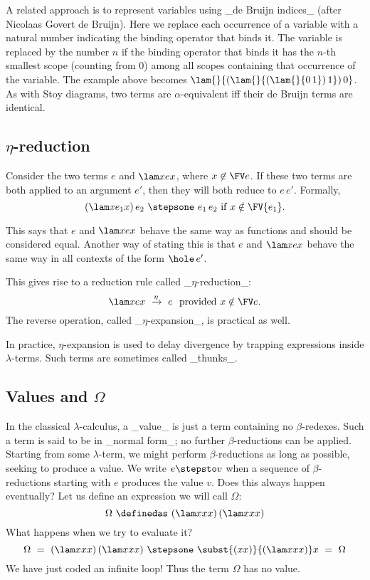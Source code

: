 A related approach is
to represent variables using _de Bruijn indices_ (after Nicolaas Govert de Bruijn). Here we
replace each occurrence of a variable with a natural number indicating the binding operator
that binds it. The variable is replaced by the number $n$ if the binding operator that binds
it has the $n$-th smallest scope (counting from 0) among all scopes containing that occurrence
of the variable. The example above becomes $\lam {}{(\lam {}{(\lam {}{0\,1})\,1})\,0}$.
As with Stoy diagrams, two terms are $\alpha$-equivalent iff their de Bruijn terms are identical.

\subsection{$\eta$-reduction}

Consider the two terms $e$ and $\lam x{ex}$, where $x\not\in\FV e$.
If these two terms are both applied to an argument $e'$, then they will both reduce to $e\,e'$. Formally,
\[
(\lam x{e_1x})\,e_2\ \stepsone\ e_1\,e_2 \text{ if $x\notin\FV{e_1}$}.
\]

This says that $e$ and $\lam x{ex}$ behave the same way as functions and should be considered equal. Another way of stating this is that $e$ and $\lam x{ex}$ behave the same way in all contexts of the form $\hole\,e'$.

This gives rise to a reduction rule called _$\eta$-reduction_:
\[
\lam x{ex}\ \xrightarrow{\eta}\ e\ \text{ provided $x\notin\FV e$}.
\]
The reverse operation, called _$\eta$-expansion_, is practical as well.

In practice, $\eta$-expansion is used to delay divergence by trapping
expressions inside $\lambda$-terms. Such terms are sometimes called _thunks_.

\subsection{Values and $\Omega$}

In the classical $\lambda$-calculus, a _value_ is just a term containing no $\beta$-redexes. Such a term is said to be in _normal form_; no further $\beta$-reductions can be applied. Starting from some $\lambda$-term, we might perform $\beta$-reductions as long as possible, seeking to produce a value. We write $e\stepsto v$ when a sequence of $\beta$-reductions starting with $e$ produces the value $v$. Does this always happen eventually? Let us define an expression we will call $\Omega$:
\[
\Omega\ \definedas\ (\lam x{xx})\,(\lam x{xx})
\]
What happens when we try to evaluate it?
\[
\Omega\ =\ (\lam x{xx})\,(\lam x{xx})
\ \stepsone\ \subst{(xx)}{(\lam x{xx})}x
\ =\ \Omega
\]
We have just coded an infinite loop! Thus the term $\Omega$ has no value.

